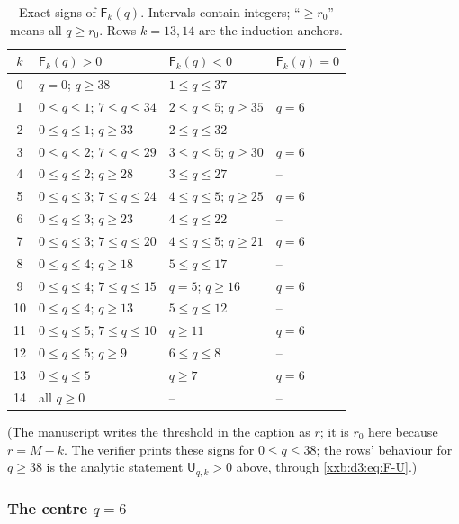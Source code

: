 \documentclass[11pt,a4paper]{article}
\numberwithin{equation}{section}
\theoremstyle{definition}
\theoremstyle{remark}
\theoremstyle{plain}
\begin{document}
\begin{table}[ht]
\centering
\small
\caption{Exact signs of $\mathsf F_k(q)$.  Intervals contain integers;
``$\geq r_0$'' means all $q\geq r_0$.  Rows $k=13,14$ are the induction
anchors.}
\label{xxb:d3:tab:F-signs}
\begin{tabular}{@{}c>{\raggedright\arraybackslash}p{}>{\raggedright\arraybackslash}p{}>{\raggedright\arraybackslash}p{}@{}}
\toprule
$k$ & $\mathsf F_k(q)>0$ & $\mathsf F_k(q)<0$ & $\mathsf F_k(q)=0$\\
\midrule
0  & $q=0$; $q\geq38$ & $1\leq q\leq37$ & --\\
1  & $0\leq q\leq1$; $7\leq q\leq34$ & $2\leq q\leq5$; $q\geq35$ & $q=6$\\
2  & $0\leq q\leq1$; $q\geq33$ & $2\leq q\leq32$ & --\\
3  & $0\leq q\leq2$; $7\leq q\leq29$ & $3\leq q\leq5$; $q\geq30$ & $q=6$\\
4  & $0\leq q\leq2$; $q\geq28$ & $3\leq q\leq27$ & --\\
5  & $0\leq q\leq3$; $7\leq q\leq24$ & $4\leq q\leq5$; $q\geq25$ & $q=6$\\
6  & $0\leq q\leq3$; $q\geq23$ & $4\leq q\leq22$ & --\\
7  & $0\leq q\leq3$; $7\leq q\leq20$ & $4\leq q\leq5$; $q\geq21$ & $q=6$\\
8  & $0\leq q\leq4$; $q\geq18$ & $5\leq q\leq17$ & --\\
9  & $0\leq q\leq4$; $7\leq q\leq15$ & $q=5$; $q\geq16$ & $q=6$\\
10 & $0\leq q\leq4$; $q\geq13$ & $5\leq q\leq12$ & --\\
11 & $0\leq q\leq5$; $7\leq q\leq10$ & $q\geq11$ & $q=6$\\
12 & $0\leq q\leq5$; $q\geq9$ & $6\leq q\leq8$ & --\\
13 & $0\leq q\leq5$ & $q\geq7$ & $q=6$\\
14 & all $q\geq0$ & -- & --\\
\bottomrule
\end{tabular}
\end{table}

(The manuscript writes the threshold in the caption as $r$; it is $r_0$ here
because $r=M-k$.  The verifier prints these signs for $0\le q\le38$; the rows'
behaviour for $q\ge38$ is the analytic statement $\mathsf U_{q,k}>0$ above,
through \eqref{xxb:d3:eq:F-U}.)

\subsubsection{The centre \texorpdfstring{$q=6$}{q=6}}
\end{document}

